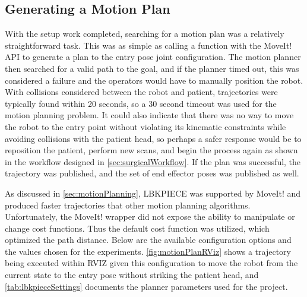 \documentclass[12pt]{report}
\begin{document}
\subsection{Generating a Motion Plan}
With the setup work completed, searching for a motion plan was a relatively straightforward task. This was as simple as calling a function with the MoveIt! API to generate a plan to the entry pose joint configuration. The motion planner then searched for a valid path to the goal, and if the planner timed out, this was considered a failure and the operators would have to manually position the robot. With collisions considered between the robot and patient, trajectories were typically found within 20 seconds, so a 30 second timeout was used for the motion planning problem. It could also indicate that there was no way to move the robot to the entry point without violating its kinematic constraints while avoiding collisions with the patient head, so perhaps a safer response would be to reposition the patient, perform new scans, and begin the process again as shown in the workflow designed in \autoref{sec:surgicalWorkflow}. If the plan was successful, the trajectory was published, and the set of end effector poses was published as well.

As discussed in \autoref{sec:motionPlanning}, LBKPIECE was supported by MoveIt! and produced faster trajectories that other motion planning algorithms. Unfortunately, the MoveIt! wrapper did not expose the ability to manipulate or change cost functions. Thus the default cost function was utilized, which optimized the path distance. Below are the available configuration options and the values chosen for the experiments. \autoref{fig:motionPlanRViz} shows a trajectory being executed within RVIZ given this configuration to move the robot from the current state to the entry pose without striking the patient head, and \autoref{tab:lbkpieceSettings} documents the planner parameters used for the project.

\end{document}
